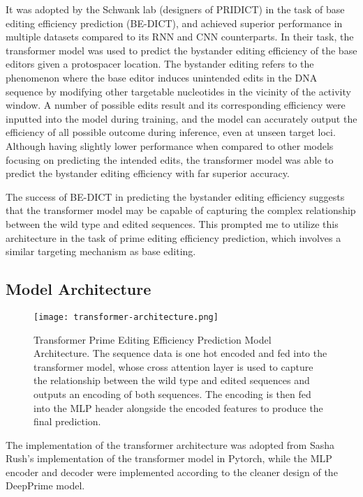 It was adopted by the Schwank lab (designers of PRIDICT) in the task of base editing efficiency prediction (BE-DICT), and achieved superior performance in multiple datasets compared to its RNN and CNN counterparts\cite{marquartPredictingBaseEditing2021}. In their task, the transformer model was used to predict the bystander editing efficiency of the base editors given a protospacer location. The bystander editing refers to the phenomenon where the base editor induces unintended edits in the DNA sequence by modifying other targetable nucleotides in the vicinity of the activity window. A number of possible edits result and its corresponding efficiency were inputted into the model during training, and the model can accurately output the efficiency of all possible outcome during inference, even at unseen target loci. Although having slightly lower performance when compared to other models focusing on predicting the intended edits, the transformer model was able to predict the bystander editing efficiency with far superior accuracy.

The success of BE-DICT in predicting the bystander editing efficiency suggests that the transformer model may be capable of capturing the complex relationship between the wild type and edited sequences. This prompted me to utilize this architecture in the task of prime editing efficiency prediction, which involves a similar targeting mechanism as base editing.

\subsection{Model Architecture}

\begin{figure}
    \centering
    \texttt{[image: transformer-architecture.png]}
    \caption[Transformer Model Architecture]{Transformer Prime Editing Efficiency Prediction Model Architecture. The sequence data is one hot encoded and fed into the transformer model, whose cross attention layer is used to capture the relationship between the wild type and edited sequences and outputs an encoding of both sequences. The encoding is then fed into the MLP header alongside the encoded features to produce the final prediction.}
    \label{fig:transformer-model}
\end{figure}

The implementation of the transformer architecture was adopted from Sasha Rush's implementation of the transformer model in Pytorch\cite{AnnotatedTransformer}, while the MLP encoder and decoder were implemented according to the cleaner design of the DeepPrime model\cite{yuPredictionEfficienciesDiverse2023}.

